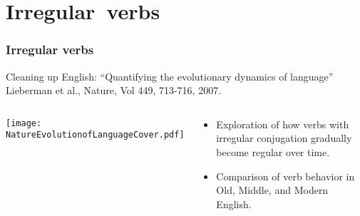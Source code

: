 

















\section{Irregular\ verbs}

\begin{frame}
  \frametitle{Irregular verbs}

  \begin{block}{Cleaning up English:}
    \alert{``Quantifying the evolutionary dynamics of language''}\cite{lieberman2007a}\\
    Lieberman et al., Nature, Vol 449, 713-716, 2007.
  \end{block}

  \begin{columns}
    \texttt{[image: NatureEvolutionofLanguageCover.pdf]}
    \begin{block}{}
      \begin{itemize}
      \item<1-> 
        Exploration of how verbs with irregular 
        conjugation gradually become regular over time.
      \item<1-> 
        Comparison of verb behavior in Old, Middle, and Modern English.
      \end{itemize}
    \end{block}
  \end{columns}

\end{frame}

